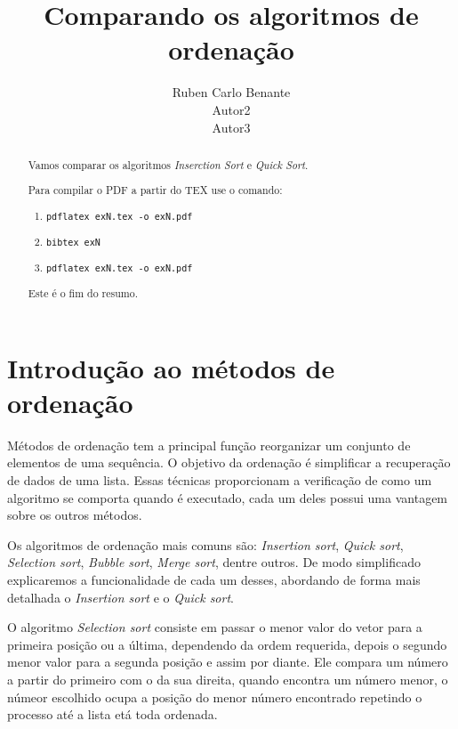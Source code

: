 \documentclass[a4paper,10pt]{article} %
\title{Comparando os algoritmos de ordenação}
\author{Ruben Carlo Benante \\ Autor2 \\ Autor3}
\begin{document}
\maketitle

\begin{abstract}

Vamos comparar os algoritmos \textit{Inserction Sort} e \textit{Quick Sort}.

Para compilar o PDF a partir do TEX use o comando:

\begin{enumerate}
 \item \texttt{pdflatex exN.tex -o exN.pdf}
 \item \texttt{bibtex exN}
 \item \texttt{pdflatex exN.tex -o exN.pdf}
\end{enumerate}

Este é o fim do resumo.

\end{abstract}


\section{Introdução ao métodos de ordenação}

    Métodos de ordenação tem a principal função reorganizar um conjunto de elementos de uma sequência. O objetivo da ordenação é simplificar a recuperação de dados de uma lista. Essas técnicas proporcionam a verificação de como um algoritmo se comporta quando é executado, cada um deles possui uma vantagem sobre os outros métodos.

    Os algoritmos de ordenação mais comuns são: \textit{Insertion sort},  \textit{Quick sort},  \textit{Selection sort},  \textit{Bubble sort},  \textit{Merge sort}, dentre outros. De modo simplificado explicaremos a funcionalidade de cada um desses, abordando de forma mais detalhada o \textit{Insertion sort} e o \textit{Quick sort}.

    O algoritmo \textit{Selection sort} consiste em passar o menor valor do vetor para a primeira posição ou a última, dependendo da ordem requerida, depois o segundo menor valor para a segunda posição e assim por diante. Ele compara um número a partir do primeiro com o da sua direita, quando encontra um número menor, o númeor escolhido ocupa a posição do menor número encontrado repetindo o processo até a lista etá toda ordenada.
    
\end{document}
